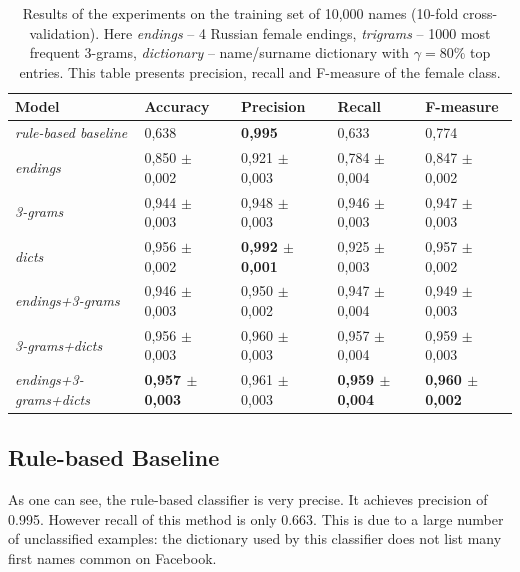 \documentclass[runningheads,a4paper]{llncs}
\begin{document}
\begin{table}[h]

\footnotesize

\begin{center}
\begin{tabular}{|l|l|l|l|l|}
\hline
\bf Model & \bf Accuracy & \bf Precision & \bf Recall & \bf F-measure \\ \hline \hline

\textit{rule-based baseline} &  0,638 & \bf 0,995 & 0,633 & 0,774 \\   

\textit{endings} & 0,850 $\pm$ 0,002 & 0,921 $\pm$ 0,003 & 0,784 $\pm$ 0,004 & 0,847 $\pm$ 0,002 \\

\textit{3-grams} & 0,944 $\pm$ 0,003 & 0,948 $\pm$ 0,003 & 0,946 $\pm$ 0,003 & 0,947 $\pm$ 0,003 \\

\textit{dicts} & 0,956 $\pm$ 0,002 & \bf 0,992 $\pm$ 0,001 & 0,925 $\pm$ 0,003 & 0,957 $\pm$ 0,002 \\ 

\textit{endings+3-grams} & 0,946 $\pm$ 0,003 & 0,950 $\pm$ 0,002 & 0,947 $\pm$ 0,004 & 0,949 $\pm$ 0,003 \\

\textit{3-grams+dicts} & 0,956 $\pm$ 0,003 & 0,960 $\pm$ 0,003 &  0,957 $\pm$ 0,004 &  0,959 $\pm$ 0,003 \\ 
 
\textit{endings+3-grams+dicts} & \bf 0,957 $\pm$ 0,003 & 0,961 $\pm$ 0,003 & \bf 0,959 $\pm$ 0,004 & \bf 0,960 $\pm$ 0,002  \\

\hline
\end{tabular}
\end{center}
\caption{ Results of the experiments on the training set of 10,000 names (10-fold cross-validation). Here \textit{endings} -- 4  Russian female endings, \textit{trigrams} -- 1000 most frequent 3-grams, \textit{dictionary} -- name/surname dictionary with $\gamma=80\%$ top entries. This table presents precision, recall and F-measure of the female class. }
\label{tab:results}
\end{table}

\subsection{Rule-based Baseline} As one can see, the rule-based classifier is very precise. It achieves precision of 0.995. However recall of this method is only 0.663. This is due to a large number of unclassified examples: the dictionary used by this classifier does not list many first names common on Facebook. 
\end{document}
